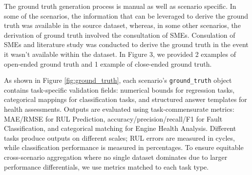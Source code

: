 \documentclass[sigconf,review]{acmart}
\begin{document}
The ground truth generation process is manual as well as scenario specific. In some of the scenarios, the information that can be leveraged to derive the ground truth was available in the source dataset, whereas, in some other scenarios, the derivation of ground truth involved the consultation of SMEs. Consulation of SMEs and literature study was conducted to derive the ground truth in the event it wasn't available within the dataset. In Figure 3, we provided 2 examples of open-ended ground truth and 1 example of close-ended ground truth.


As shown in Figure \ref{fig:ground_truth}, each scenario's \texttt{ground\_truth} object contains task-specific validation fields: numerical bounds for regression tasks, categorical mappings for classification tasks, and structured answer templates for health assessments. Outputs are evaluated using task-commensurate metrics: MAE/RMSE for RUL Prediction, accuracy/precision/recall/F1 for Fault Classification, and categorical matching for Engine Health Analysis. Different tasks produce outputs on different scales; RUL errors are measured in cycles, while classification performance is measured in percentages. To ensure equitable cross-scenario aggregation where no single dataset dominates due to larger performance differentials, we use metrics matched to each task type.                               
                                                             
\end{document}
